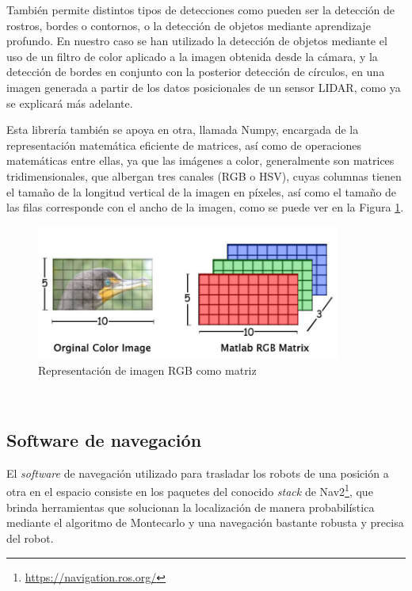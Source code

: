 También permite distintos tipos de detecciones como pueden ser la detección de
rostros, bordes o contornos, o la detección de objetos mediante aprendizaje
profundo.
En nuestro caso se han utilizado la detección de objetos mediante el uso de un
filtro de color aplicado a la imagen obtenida desde la cámara, y la detección de
bordes en conjunto con la posterior detección de círculos, en una imagen
generada a partir de los datos posicionales de un sensor LIDAR, como ya se
explicará más adelante.

Esta librería también se apoya en otra, llamada Numpy, encargada de la
representación matemática eficiente de matrices, así como de operaciones
matemáticas entre ellas, ya que las imágenes a color, generalmente son matrices
tridimensionales, que albergan tres canales (RGB o HSV), cuyas columnas tienen
el tamaño de la longitud vertical de la imagen en píxeles, así como el tamaño de
las filas corresponde con el ancho de la imagen, como se puede ver en la Figura
\ref{fig:rgb_mat}.

\begin{figure} [h!]
  \begin{center}
    \includegraphics[width=10cm]{figs/rgb_matrix}
  \end{center}
  \caption{Representación de imagen RGB como matriz \cite{rgb_mat}}
  \label{fig:rgb_mat}
\end{figure}\


\subsection{Software de navegación}
\label{sec:navegacion}

El \textit{software} de navegación utilizado para trasladar los robots de una
posición a otra en el espacio consiste en los paquetes del conocido
\textit{stack} de Nav2\footnote{\url{https://navigation.ros.org/}}, que brinda
herramientas que solucionan la localización de manera probabilística mediante el
algoritmo de Montecarlo y una navegación bastante robusta y precisa del robot.

